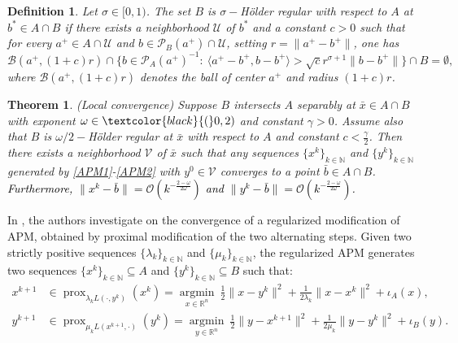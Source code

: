 \documentclass[pdflatex,sn-mathphys-num]{sn-jnl}
\numberwithin{equation}{section}%
\def\R{\mathbb{R}}
\def\N{\mathbb{N}}
\newcommand{\proj}{\mathcal{P}}
\newcommand{\prox}{\operatorname{prox}}
\newcommand{\REV}[1]{\textcolor{black}{#1}}
\theoremstyle{thmstyleone}%
\newtheorem{theorem}{Theorem}[section]%
\theoremstyle{thmstyletwo}%
\theoremstyle{thmstylethree}%
\newtheorem{definition}{Definition}[section]%
\begin{document}
\begin{definition}\label{def:holder}\cite[Definition 2]{Noll-etal-2016}
    Let $\sigma\in [0,1)$. The set $B$ is $\sigma-$\emph{H\"older regular} with respect to $A$ at $b^*\in A\cap B$ if there exists a neighborhood $\mathcal{U}$ of $b^*$ and a constant $c>0$ such that for every $a^+\in A\cap \mathcal{U}$ and $b\in\proj_B(a^+)\cap \mathcal{U}$, setting $r = \|a^+-b^+\|$, one has
    \begin{equation*}
        \mathcal{B}(a^+,(1+c)r)\cap \{b\in \proj_A(a^+)^{-1}: \ \langle a^+-b^+,b-b^+\rangle > \sqrt{c}r^{\sigma+1}\|b-b^+\|\}\cap B =\emptyset,
    \end{equation*}
    where $\mathcal{B}(a^+,(1+c)r)$ denotes the ball of center $a^+$ and radius $(1+c)r$.
\end{definition}

\begin{theorem}\cite[Theorem 1, \REV{Corollary 4}]{Noll-etal-2016}\label{thm:conv_APM} (Local convergence)
    Suppose $B$ intersects $A$ separably at $\bar{x}\in A \cap B$ with exponent $\omega\in\REV{(}0,2)$ and constant $\gamma>0$. Assume also that $B$ is $\omega/2-$H\"older regular at $\bar{x}$ with respect to $A$ and constant $c<\frac{\gamma}{2}$. Then there exists a neighborhood $\mathcal{V}$ of $\bar{x}$ such that any sequences $\{x^k\}_{k\in\mathbb{N}}$ and $\{y^k\}_{k\in\mathbb{N}}$ generated by \eqref{APM1}-\eqref{APM2} with $y^0\in \mathcal{V}$ converges to a point $\bar{b}\in A\cap B$. \REV{Furthermore, $\|x^k-\bar{b}\|=\mathcal{O}(k^{-\frac{2-\omega}{2\omega}})$ and $\|y^k-\bar{b}\|=\mathcal{O}(k^{-\frac{2-\omega}{2\omega}})$.}
\end{theorem}

In \cite{attouch2010proximal,attouch2007}, the authors investigate on the convergence of a regularized modification of APM, obtained by proximal modification of the two alternating steps. Given two strictly positive sequences $\{\lambda_k\}_{k\in\N}$ and $\{\mu_k\}_{k\in\N}$, the regularized APM generates two sequences $\{x^k\}_{k\in\N}\subseteq A$ and $\{y^k\}_{k\in\N}\subseteq B$  such that:
\begin{align*}
     x^{k+1}&\in \prox_{\lambda_k L(\cdot,y^k)}(x^k)=\underset{x\in \R^n}{\operatorname{argmin}} \ \frac{1}{2}\|x-y^k\|^2+\frac{1}{2\lambda_k}\|x-x^k\|^2+\iota_A(x), \\
    y^{k+1}&\in \prox_{\mu_k L(x^{k+1},\cdot)}(y^k)=\underset{y\in \R^n}{\operatorname{argmin}} \ \frac{1}{2}\|y-x^{k+1}\|^2+\frac{1}{2\mu_k}\|y-y^k\|^2+\iota_B(y).
\end{align*}
\end{document}
